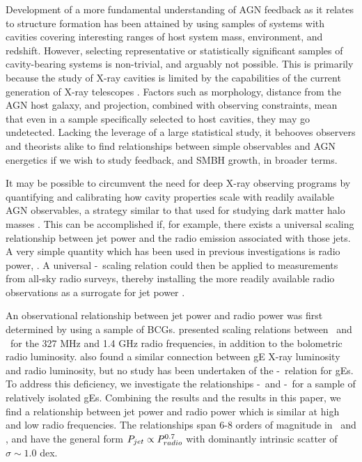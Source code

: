 \documentclass{emulateapj}
\begin{document}
Development of a more fundamental understanding of AGN feedback as it
relates to structure formation has been attained by using samples of
systems with cavities covering interesting ranges of host system mass,
environment, and redshift. However, selecting representative or
statistically significant samples of cavity-bearing systems is
non-trivial, and arguably not possible. This is primarily because the
study of X-ray cavities is limited by the capabilities of the current
generation of X-ray telescopes \citep{2009arXiv0909.0397B}. Factors
such as morphology, distance from the AGN host galaxy, and projection,
combined with observing constraints, mean that even in a sample
specifically selected to host cavities, they may go
undetected. Lacking the leverage of a large statistical study, it
behooves observers and theorists alike to find relationships between
simple observables and AGN energetics if we wish to study feedback,
and SMBH growth, in broader terms.

It may be possible to circumvent the need for deep X-ray observing
programs by quantifying and calibrating how cavity properties scale
with readily available AGN observables, a strategy similar to that
used for studying dark matter halo masses \citep[\eg][]{kravtsov06,
  2007ApJ...668..772M, 2009A&A...498..361P}. This can be accomplished
if, for example, there exists a universal scaling relationship between
jet power and the radio emission associated with those jets. A very
simple quantity which has been used in previous investigations is
radio power, \prad. A universal \pjet-\prad\ scaling relation could
then be applied to measurements from all-sky radio surveys, thereby
installing the more readily available radio observations as a
surrogate for jet power \citep{croton06, 2006MNRAS.366..397S}.

An observational relationship between jet power and radio power was
first determined by \citet{birzan04, birzan08} using a sample of
BCGs. \citet{birzan04, birzan08} presented scaling relations between
\pjet\ and \prad\ for the 327 MHz and 1.4 GHz radio frequencies, in
addition to the bolometric radio
luminosity. \citet{2008ApJ...680..897D} also found a similar
connection between gE X-ray luminosity and radio luminosity, but no
study has been undertaken of the \pjet-\prad\ relation for gEs. To
address this deficiency, we investigate the relationships
\pjet-\phigh\ and \pjet-\plow\ for a sample of relatively isolated
gEs. Combining the \citet{birzan08} results and the results in this
paper, we find a relationship between jet power and radio power which
is similar at high and low radio frequencies. The relationships span
6-8 orders of magnitude in \pjet\ and \prad, and have the general form
$P_{jet} \propto P_{radio}^{0.7}$ with dominantly intrinsic scatter of
$\sigma \sim 1.0$ dex.
\end{document}

